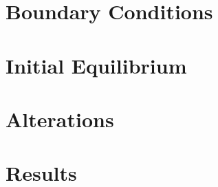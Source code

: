 \documentclass[a4paper, nobind]{templates/ociamthesis}
\begin{document}
\hypertarget{boundary-conditions}{%
\section{Boundary Conditions}\label{boundary-conditions}}

\hypertarget{initial-equilibrium}{%
\section{Initial Equilibrium}\label{initial-equilibrium}}

\hypertarget{alterations}{%
\section{Alterations}\label{alterations}}

\hypertarget{results}{%
\section{Results}\label{results}}
\end{document}
